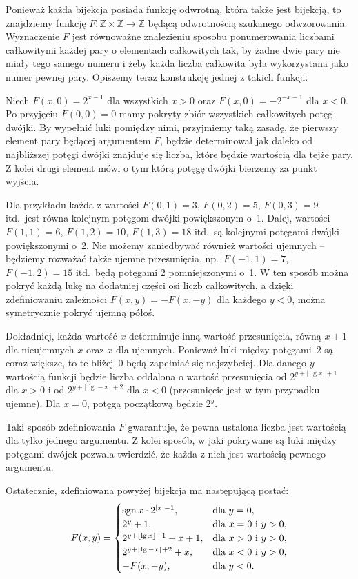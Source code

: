\exercise %
Ponieważ każda bijekcja posiada funkcję odwrotną, która także jest bijekcją, to znajdziemy funkcję $F\colon\mathbb{Z}\times\mathbb{Z}\to\mathbb{Z}$ będącą odwrotnością szukanego odwzorowania. Wyznaczenie $F$ jest równoważne znalezieniu sposobu ponumerowania liczbami całkowitymi każdej pary o elementach całkowitych tak, by żadne dwie pary nie miały tego samego numeru i żeby każda liczba całkowita była wykorzystana jako numer pewnej pary. Opiszemy teraz konstrukcję jednej z takich funkcji.

Niech $F(x,0)=2^{x-1}$ dla wszystkich $x>0$ oraz $F(x,0)=-2^{-x-1}$ dla $x<0$. Po przyjęciu $F(0,0)=0$ mamy pokryty zbiór wszystkich całkowitych potęg dwójki. By wypełnić luki pomiędzy nimi, przyjmiemy taką zasadę, że pierwszy element pary będącej argumentem $F$, będzie determinował jak daleko od najbliższej potęgi dwójki znajduje się liczba, które będzie wartością dla tejże pary. Z kolei drugi element mówi o tym którą potęgę dwójki bierzemy za punkt wyjścia.

Dla przykładu każda z wartości $F(0,1)=3$, $F(0,2)=5$, $F(0,3)=9$ itd.\ jest równa kolejnym potęgom dwójki powiększonym o~1. Dalej, wartości $F(1,1)=6$, $F(1,2)=10$, $F(1,3)=18$ itd.\ są kolejnymi potęgami dwójki powiększonymi o~2. Nie możemy zaniedbywać również wartości ujemnych -- będziemy rozważać także ujemne przesunięcia, np.\ $F(-1,1)=7$, $F(-1,2)=15$ itd.\ będą potęgami 2 pomniejszonymi o~1. W ten sposób można pokryć każdą lukę na dodatniej części osi liczb całkowitych, a dzięki zdefiniowaniu zależności $F(x,y)=-F(x,-y)$ dla każdego $y<0$, można symetrycznie pokryć ujemną półoś.

Dokładniej, każda wartość $x$ determinuje inną wartość przesunięcia, równą $x+1$ dla nieujemnych $x$ oraz $x$ dla ujemnych. Ponieważ luki między potęgami~2 są coraz większe, to te bliżej~0 będą zapełniać się najszybciej. Dla danego $y$ wartością funkcji będzie liczba oddalona o wartość przesunięcia od $2^{y+\lfloor\lg x\rfloor+1}$ dla $x>0$ i od $2^{y+\lfloor\lg-x\rfloor+2}$ dla $x<0$ (przesunięcie jest w tym przypadku ujemne). Dla $x=0$, potęgą początkową będzie $2^y$.

Taki sposób zdefiniowania $F$ gwarantuje, że pewna ustalona liczba jest wartością dla tylko jednego argumentu. Z kolei sposób, w jaki pokrywane są luki między potęgami dwójek pozwala twierdzić, że każda z nich jest wartością pewnego argumentu.

Ostatecznie, zdefiniowana powyżej bijekcja ma następującą postać:
\[
	F(x,y) =
	\begin{cases}
		\operatorname{sgn} x\cdot2^{|x|-1}, & \text{dla $y=0$}, \\
		2^y+1, & \text{dla $x=0$ i $y>0$}, \\
		2^{y+\lfloor\lg x\rfloor+1}+x+1, & \text{dla $x>0$ i $y>0$}, \\
		2^{y+\lfloor\lg-x\rfloor+2}+x, & \text{dla $x<0$ i $y>0$}, \\
		-F(x,-y), & \text{dla $y<0$}.
	\end{cases}
\]

